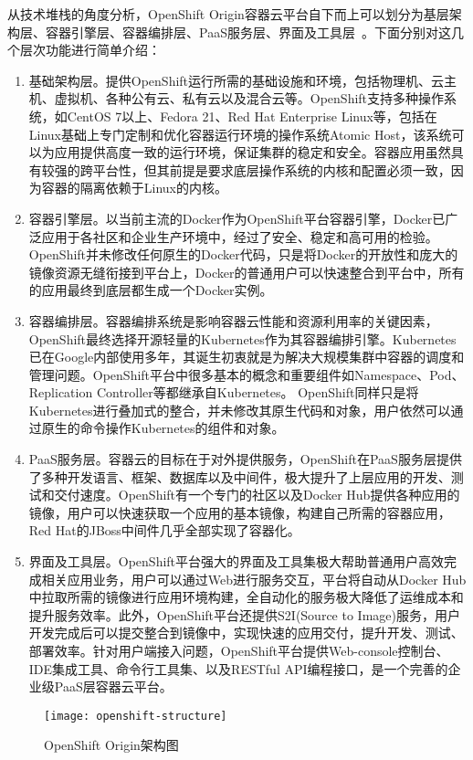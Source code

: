 从技术堆栈的角度分析，OpenShift Origin容器云平台自下而上可以划分为基层架构层、容器引擎层、容器编排层、PaaS服务层、界面及工具层~\cite{2017Kubernetes}。下面分别对这几个层次功能进行简单介绍：
\begin{enumerate}[1.]
	\item 基础架构层。提供OpenShift运行所需的基础设施和环境，包括物理机、云主机、虚拟机、各种公有云、私有云以及混合云等。OpenShift支持多种操作系统，如CentOS 7以上、Fedora 21、Red Hat Enterprise Linux等，包括在Linux基础上专门定制和优化容器运行环境的操作系统Atomic Host，该系统可以为应用提供高度一致的运行环境，保证集群的稳定和安全。容器应用虽然具有较强的跨平台性，但其前提是要求底层操作系统的内核和配置必须一致，因为容器的隔离依赖于Linux的内核。
	\item 容器引擎层。以当前主流的Docker作为OpenShift平台容器引擎，Docker已广泛应用于各社区和企业生产环境中，经过了安全、稳定和高可用的检验。OpenShift并未修改任何原生的Docker代码，只是将Docker的开放性和庞大的镜像资源无缝衔接到平台上，Docker的普通用户可以快速整合到平台中，所有的应用最终到底层都生成一个Docker实例。
	\item 容器编排层。容器编排系统是影响容器云性能和资源利用率的关键因素，OpenShift最终选择开源轻量的Kubernetes作为其容器编排引擎。Kubernetes已在Google内部使用多年，其诞生初衷就是为解决大规模集群中容器的调度和管理问题。OpenShift平台中很多基本的概念和重要组件如Namespace、Pod、Replication Controller等都继承自Kubernetes。
	OpenShift同样只是将Kubernetes进行叠加式的整合，并未修改其原生代码和对象，用户依然可以通过原生的命令操作Kubernetes的组件和对象。
	\item PaaS服务层。容器云的目标在于对外提供服务，OpenShift在PaaS服务层提供了多种开发语言、框架、数据库以及中间件，极大提升了上层应用的开发、测试和交付速度。OpenShift有一个专门的社区以及Docker Hub提供各种应用的镜像，用户可以快速获取一个应用的基本镜像，构建自己所需的容器应用，Red Hat的JBoss中间件几乎全部实现了容器化。
	\item 界面及工具层。OpenShift平台强大的界面及工具集极大帮助普通用户高效完成相关应用业务，用户可以通过Web进行服务交互，平台将自动从Docker Hub中拉取所需的镜像进行应用环境构建，全自动化的服务极大降低了运维成本和提升服务效率。此外，OpenShift平台还提供S2I(Source to Image)服务，用户开发完成后可以提交整合到镜像中，实现快速的应用交付，提升开发、测试、部署效率。针对用户端接入问题，OpenShift平台提供Web-console控制台、IDE集成工具、命令行工具集、以及RESTful API编程接口，是一个完善的企业级PaaS层容器云平台。
\end{enumerate}
\begin{figure}[H] %
	\centering
	\texttt{[image: openshift-structure]}
	\caption{OpenShift Origin架构图}
\end{figure}

